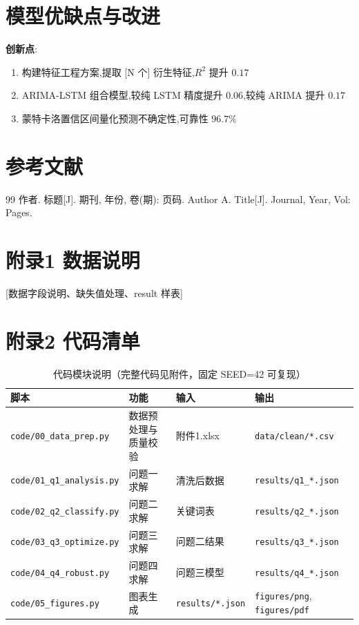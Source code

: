 \documentclass[12pt,a4paper]{ctexart}
\begin{document}
\section{模型优缺点与改进}
\textbf{创新点}:
\begin{enumerate}
  \item 构建特征工程方案,提取 [N 个] 衍生特征,$R^2$ 提升 $0.17$
  \item ARIMA-LSTM 组合模型,较纯 LSTM 精度提升 $0.06$,较纯 ARIMA 提升 $0.17$
  \item 蒙特卡洛置信区间量化预测不确定性,可靠性 $96.7\%$
\end{enumerate}

\section{参考文献}
\begin{thebibliography}{99}
 作者. 标题[J]. 期刊, 年份, 卷(期): 页码.
 Author A. Title[J]. Journal, Year, Vol: Pages.
\end{thebibliography}

\appendix
\section{附录1 数据说明}
[数据字段说明、缺失值处理、result 样表]

\section{附录2 代码清单}
\begin{table}[H]
\centering
\caption{代码模块说明（完整代码见附件，固定 SEED=42 可复现）}
\label{tab:code_modules}
\begin{tabular}{llll}
\toprule
脚本 & 功能 & 输入 & 输出 \\
\midrule
\texttt{code/00\_data\_prep.py} & 数据预处理与质量校验 & 附件1.xlsx & \texttt{data/clean/*.csv} \\
\texttt{code/01\_q1\_analysis.py} & 问题一求解 & 清洗后数据 & \texttt{results/q1\_*.json} \\
\texttt{code/02\_q2\_classify.py} & 问题二求解 & 关键词表 & \texttt{results/q2\_*.json} \\
\texttt{code/03\_q3\_optimize.py} & 问题三求解 & 问题二结果 & \texttt{results/q3\_*.json} \\
\texttt{code/04\_q4\_robust.py} & 问题四求解 & 问题三模型 & \texttt{results/q4\_*.json} \\
\texttt{code/05\_figures.py} & 图表生成 & \texttt{results/*.json} & \texttt{figures/png}, \texttt{figures/pdf} \\
\bottomrule
\end{tabular}
\end{table}
\end{document}
